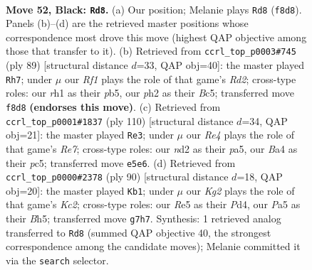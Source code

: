 \documentclass[11pt]{article}
\begin{document}
\clearpage

\begin{figure}[p]\centering
\begin{subfigure}{0.46\textwidth}\centering
\resizebox{\linewidth}{!}{%
\newchessgame
\chessboard[
  setfen={5r2/6k1/1p6/p1p1r3/b7/2P3PN/K2N1p1P/7R b - - 1 52},
  showmover=false,
  pgfstyle=straightmove, color=movearrow, markmove={f8-d8}
]}
\caption{}
\end{subfigure}\hfill
\begin{subfigure}{0.46\textwidth}\centering
\resizebox{\linewidth}{!}{%
\newchessgame
\chessboard[
  setfen={2k5/p2r4/2N2p2/1Pb1p1p1/2P3P1/2K5/8/4R3 b - - 1 45},
  showmover=false,
  pgfstyle=straightmove, color=movearrow, markmove={d7-h7}
]}
\caption{}
\end{subfigure}
\\[4pt]
\begin{subfigure}{0.46\textwidth}\centering
\resizebox{\linewidth}{!}{%
\newchessgame
\chessboard[
  setfen={8/4R3/3r1n1k/p1p2Bp1/2P3P1/1P3p2/P7/2K5 w - - 0 56},
  showmover=false,
  pgfstyle=straightmove, color=movearrow, markmove={e7-e3}
]}
\caption{}
\end{subfigure}\hfill
\begin{subfigure}{0.46\textwidth}\centering
\resizebox{\linewidth}{!}{%
\newchessgame
\chessboard[
  setfen={r7/1p4k1/2p5/2P2R1B/3PnP2/p3P2p/2K4P/8 w - - 1 46},
  showmover=false,
  pgfstyle=straightmove, color=movearrow, markmove={c2-b1}
]}
\caption{}
\end{subfigure}
\caption{\textbf{Move 52, Black: \texttt{Rd8}.} (a) Our position; Melanie plays \texttt{Rd8} (\texttt{f8d8}). Panels (b)--(d) are the retrieved master positions whose correspondence most drove this move (highest QAP objective among those that transfer to it). (b) Retrieved from \texttt{ccrl\_top\_p0003\#745} (ply 89) [structural distance $d$=33, QAP obj=40]: the master played \texttt{Rh7}; under $\mu$ our \emph{Rf1} plays the role of that game's \emph{Rd2}; cross-type roles: our \emph{r}h1 as their \emph{p}b5, our \emph{p}h2 as their \emph{B}c5; transferred move \texttt{f8d8} \textbf{(endorses this move)}. (c) Retrieved from \texttt{ccrl\_top\_p0001\#1837} (ply 110) [structural distance $d$=34, QAP obj=21]: the master played \texttt{Re3}; under $\mu$ our \emph{Re4} plays the role of that game's \emph{Re7}; cross-type roles: our \emph{n}d2 as their \emph{p}a5, our \emph{B}a4 as their \emph{p}c5; transferred move \texttt{e5e6}. (d) Retrieved from \texttt{ccrl\_top\_p0000\#2378} (ply 90) [structural distance $d$=18, QAP obj=20]: the master played \texttt{Kb1}; under $\mu$ our \emph{Kg2} plays the role of that game's \emph{Kc2}; cross-type roles: our \emph{R}e5 as their \emph{P}d4, our \emph{P}a5 as their \emph{B}h5; transferred move \texttt{g7h7}. Synthesis: 1 retrieved analog transferred to \texttt{Rd8} (summed QAP objective 40, the strongest correspondence among the candidate moves); Melanie committed it via the \texttt{search} selector.}
\label{fig:thought-m103}
\end{figure}
\end{document}

